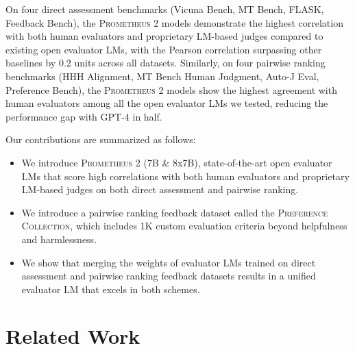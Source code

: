 \documentclass[11pt]{article}
\begin{document}
On four direct assessment benchmarks (Vicuna Bench, MT Bench, FLASK, Feedback Bench), the \textsc{Prometheus 2} models demonstrate the highest correlation with both human evaluators and proprietary LM-based judges compared to existing open evaluator LMs, with the Pearson correlation surpassing other baselines by 0.2 units across all datasets. Similarly, on four pairwise ranking benchmarks (HHH Alignment, MT Bench Human Judgment, Auto-J Eval, Preference Bench), the \textsc{Prometheus 2} models show the highest agreement with human evaluators among all the open evaluator LMs we tested, reducing the performance gap with GPT-4 in half.


Our contributions are summarized as follows:
\begin{itemize}
    \item We introduce \textsc{Prometheus 2} (7B \& 8x7B), state-of-the-art open evaluator LMs that score high correlations with both human evaluators and proprietary LM-based judges on both direct assessment and pairwise ranking.
    \item We introduce a pairwise ranking feedback dataset called the \textsc{Preference Collection}, which includes 1K custom evaluation criteria beyond helpfulness and harmlessness.
    \item We show that merging the weights of evaluator LMs trained on direct assessment and pairwise ranking feedback datasets results in a unified evaluator LM that excels in both schemes.
\end{itemize}


\section{Related Work}
\end{document}

